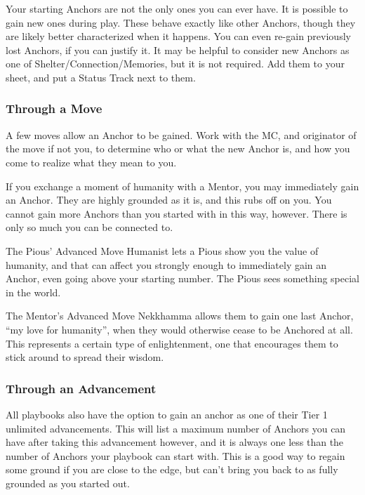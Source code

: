 \documentclass[
  oneside,
  statementpaper,
  9pt]{memoir}
\begin{document}
Your starting Anchors are not the only ones you can ever have. It is
possible to gain new ones during play. These behave exactly like other
Anchors, though they are likely better characterized when it happens.
You can even re-gain previously lost Anchors, if you can justify it. It
may be helpful to consider new Anchors as one of
Shelter/Connection/Memories, but it is not required. Add them to your
sheet, and put a Status Track next to them.

\hypertarget{through-a-move}{%
\subsubsection{Through a Move}\label{through-a-move}}

A few moves allow an Anchor to be gained. Work with the MC, and
originator of the move if not you, to determine who or what the new
Anchor is, and how you come to realize what they mean to you.

If you exchange a moment of humanity with a Mentor, you may immediately
gain an Anchor. They are highly grounded as it is, and this rubs off on
you. You cannot gain more Anchors than you started with in this way,
however. There is only so much you can be connected to.

The Pious' Advanced Move Humanist lets a Pious show you the value of
humanity, and that can affect you strongly enough to immediately gain an
Anchor, even going above your starting number. The Pious sees something
special in the world.

The Mentor's Advanced Move Nekkhamma allows them to gain one last
Anchor, ``my love for humanity'', when they would otherwise cease to be
Anchored at all. This represents a certain type of enlightenment, one
that encourages them to stick around to spread their wisdom.

\hypertarget{through-an-advancement}{%
\subsubsection{Through an Advancement}\label{through-an-advancement}}

All playbooks also have the option to gain an anchor as one of their
Tier 1 unlimited advancements. This will list a maximum number of
Anchors you can have after taking this advancement however, and it is
always one less than the number of Anchors your playbook can start with.
This is a good way to regain some ground if you are close to the edge,
but can't bring you back to as fully grounded as you started out.
\end{document}
